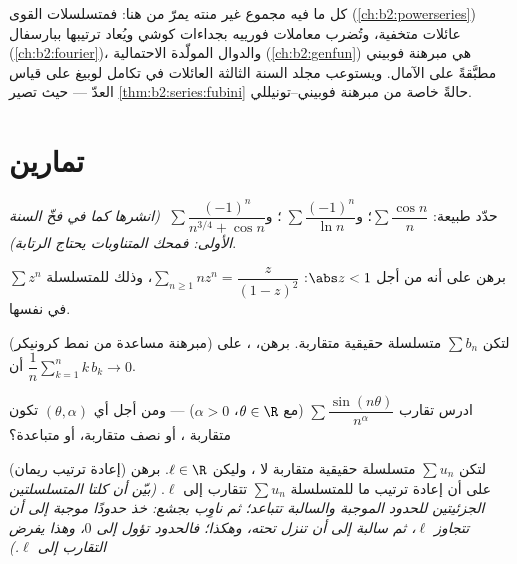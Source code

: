 \begin{remark}
كل ما فيه مجموع غير منته يمرّ من هنا: فمتسلسلات القوى
(\cref{ch:b2:powerseries}) عائلات  متخفية،
وتُضرب معاملات فورييه بجداءات كوشي ويُعاد ترتيبها
ببارسفال (\cref{ch:b2:fourier})، والدوال المولّدة
الاحتمالية (\cref{ch:b2:genfun}) هي مبرهنة فوبيني
مطبَّقةً على الآمال. ويستوعب مجلد السنة الثالثة العائلات
 في تكامل لوبيغ على قياس العدّ ---
حيث تصير \cref{thm:b2:series:fubini} حالةً خاصة من
مبرهنة فوبيني--تونيللي.
\end{remark}

\section{تمارين}

\begin{exercise}[$\star$]\label{exo:b2:series:1}
حدّد طبيعة: $\sum \dfrac{\cos n}{n}$؛ و$\;\sum \dfrac{(-1)^n}{\ln
n}$؛ و$\;\sum \dfrac{(-1)^n}{n^{3/4} + \cos n}$ \emph{(انشرها كما في
فخّ السنة الأولى: فمحك المتناوبات يحتاج الرتابة)}.
\end{exercise}

\begin{exercise}[$\star$]\label{exo:b2:series:2}
برهن على أنه من أجل $\abs z < 1$: $\sum_{n\geq1} n z^{n} =
\dfrac{z}{(1-z)^2}$، وذلك  للمتسلسلة $\sum z^n$ في
نفسها.
\end{exercise}

\begin{exercise}[$\star\star$]\label{exo:b2:series:3}
(مبرهنة مساعدة من نمط كرونيكر) لتكن $\sum b_n$ متسلسلة حقيقية متقاربة.
برهن، ، على أن $\dfrac{1}{n}\sum_{k=1}^{n} k\,b_k
\to 0$.
\end{exercise}

\begin{exercise}[$\star\star$]\label{exo:b2:series:4}
ادرس تقارب $\sum \dfrac{\sin(n\theta)}{n^\alpha}$
(مع $\theta \in \R$، $\alpha > 0$) --- ومن أجل أي $(\theta, \alpha)$ تكون
متقاربة ، أو نصف متقاربة، أو متباعدة؟
\end{exercise}

\begin{exercise}[$\star\star\star$]\label{exo:b2:series:5}
(إعادة ترتيب ريمان) لتكن $\sum u_n$ متسلسلة حقيقية متقاربة لا
، وليكن $\ell \in \R$. برهن على أن
إعادة ترتيب ما للمتسلسلة $\sum u_n$ تتقارب إلى $\ell$.
\emph{(بيّن أن كلتا المتسلسلتين الجزئيتين للحدود الموجبة والسالبة تتباعد؛
ثم ناوِب بجشع: خذ حدودًا موجبة إلى أن تتجاوز
$\ell$، ثم سالبة إلى أن تنزل تحته، وهكذا؛ فالحدود
تؤول إلى $0$، وهذا يفرض التقارب إلى $\ell$.)}
\end{exercise}

